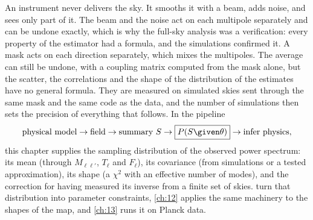 An instrument never delivers the sky. It smooths it with a beam, adds noise, and sees only part of it.
The beam and the noise act on each multipole separately and can be undone exactly, which is why the
full-sky analysis was a verification: every property of the estimator had a formula, and the
simulations confirmed it. A mask acts on each direction separately, which mixes the multipoles. The
average can still be undone, with a coupling matrix computed from the mask alone, but the scatter, the
correlations and the shape of the distribution of the estimates have no general formula. They are
measured on simulated skies sent through the same mask and the same code as the data, and the number
of simulations then sets the precision of everything that follows. In the pipeline
\[
  \text{physical model}\to\text{field}\to\text{summary }S\to
  \boxed{P(S\given\theta)}\to\text{infer physics},
\]
this chapter supplies the sampling distribution of the observed power spectrum: its mean (through
$M_{\ell\ell'}$, $T_\ell$ and $F_\ell$), its covariance (from simulations or a tested approximation), its shape
(a $\chi^2$ with an effective number of modes), and the correction for having measured its inverse from
a finite set of skies.  turn that distribution into parameter constraints, \cref{ch:12}
applies the same machinery to the shapes of the map, and \cref{ch:13} runs it on Planck data.

